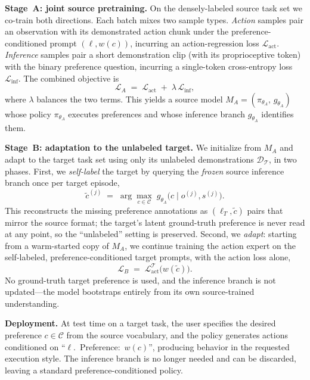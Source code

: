 \documentclass{article}
\begin{document}
\textbf{Stage~A: joint source pretraining.}
On the densely-labeled source task set we co-train both directions. Each batch
mixes two sample types. \emph{Action} samples pair an observation with its
demonstrated action chunk under the preference-conditioned prompt
$(\ell, w(c))$, incurring an action-regression loss $\mathcal{L}_{\mathrm{act}}$.
\emph{Inference} samples pair a short demonstration clip (with its proprioceptive
token) with the binary preference question, incurring a single-token
cross-entropy loss $\mathcal{L}_{\mathrm{inf}}$. The combined objective is
\begin{equation}
  \mathcal{L}_{A} \;=\; \mathcal{L}_{\mathrm{act}} \;+\; \lambda\,\mathcal{L}_{\mathrm{inf}},
  \label{eq:stageA}
\end{equation}
where $\lambda$ balances the two terms. This yields a source model
$M_A=(\pi_{\theta_A},\,g_{\theta_A})$ whose policy $\pi_{\theta_A}$ executes
preferences and whose inference branch $g_{\theta_A}$ identifies them.

\textbf{Stage~B: adaptation to the unlabeled target.}
We initialize from $M_A$ and adapt to the target task set using only its
unlabeled demonstrations $\mathcal{D}_{\mathcal{T}}$, in two phases.
First, we \emph{self-label} the target by querying the \emph{frozen} source
inference branch once per target episode,
\begin{equation}
  \tilde{c}^{(j)} \;=\; \arg\max_{c\in\mathcal{C}}\; g_{\theta_A}\!\big(c \mid o^{(j)},s^{(j)}\big).
  \label{eq:pseudolabel}
\end{equation}
This reconstructs the missing preference annotations as $(\ell_T,\tilde{c})$ pairs
that mirror the source format; the target's latent ground-truth preference is
never read at any point, so the ``unlabeled'' setting is preserved.
Second, we \emph{adapt}: starting from a warm-started copy of $M_A$, we continue
training the action expert on the self-labeled, preference-conditioned target
prompts, with the action loss alone,
\begin{equation}
  \mathcal{L}_{B} \;=\; \mathcal{L}^{\mathcal{T}}_{\mathrm{act}}\!\big(w(\tilde{c})\big).
  \label{eq:stageB}
\end{equation}
No ground-truth target preference is used, and the inference branch is not
updated---the model bootstraps entirely from its own source-trained
understanding.

\textbf{Deployment.}
At test time on a target task, the user specifies the desired preference
$c\in\mathcal{C}$ from the source vocabulary, and the policy generates actions
conditioned on ``$\ell$.~Preference:~$w(c)$'', producing behavior in the
requested execution style. The inference branch is no longer needed and can be
discarded, leaving a standard preference-conditioned policy.
\end{document}
